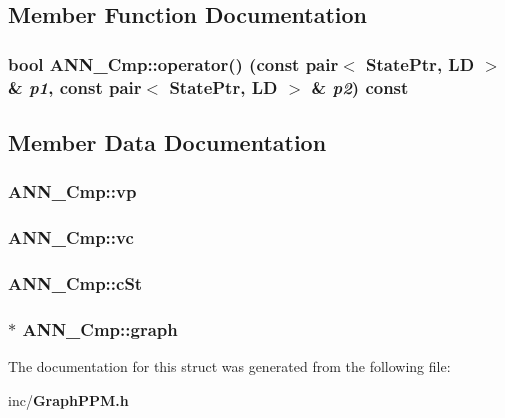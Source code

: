 \subsection{Member Function Documentation}
\subsubsection{\setlength{\rightskip}{0pt plus 5cm}bool ANN\_\-Cmp::operator() (const pair$<$ {\bf StatePtr}, {\bf LD} $>$ \& {\em p1}, const pair$<$ {\bf StatePtr}, {\bf LD} $>$ \& {\em p2}) const\hspace{0.3cm}{\tt  [inline]}}\label{structANN__Cmp_c77ac64ec1183ec05b45363965734c34}




\subsection{Member Data Documentation}
\subsubsection{ {\bf ANN\_\-Cmp::vp}}\label{structANN__Cmp_b51a891c14728116ec72700b8d3c6845}


\subsubsection{ {\bf ANN\_\-Cmp::vc}}\label{structANN__Cmp_84a7a98ca9361880edf8473b46a59533}


\subsubsection{ {\bf ANN\_\-Cmp::cSt}}\label{structANN__Cmp_7ef980857eb852154ded2f291e9a29a1}


\subsubsection{$\ast$ {\bf ANN\_\-Cmp::graph}}\label{structANN__Cmp_33beda0796ee0125db1cf7e45befb7ac}




The documentation for this struct was generated from the following file:\begin{CompactItemize}
\item 
inc/{\bf GraphPPM.h}\end{CompactItemize}
